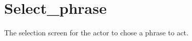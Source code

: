 \section{Select\_phrase}
\begin{figure}[h!]
\end{figure}
The selection screen for the actor to chose a phrase to act.

\newpage

